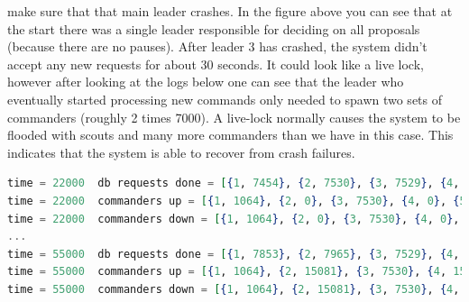 \documentclass[11pt]{article}
\begin{document}
make sure that that main leader crashes. In the figure above you can see that
at the start there was a single leader responsible for deciding on all
proposals (because there are no pauses). After leader 3 has crashed, the system
didn't accept any new requests for about 30 seconds. It could look like a live
lock, however after looking at the logs below one can see that the leader who
eventually started processing new commands only needed to
spawn two sets of commanders (roughly 2 times 7000). A live-lock normally causes the system to be
flooded with scouts and many more commanders than we have in this case. This indicates that the
system is able to recover from crash failures.
\begin{lstlisting}[language=elixir, caption={Commanders spawned before starting to make progress.},captionpos=b]
time = 22000  db requests done = [{1, 7454}, {2, 7530}, {3, 7529}, {4, 7422}, {5, 6967}]
time = 22000  commanders up = [{1, 1064}, {2, 0}, {3, 7530}, {4, 0}, {5, 1063}]
time = 22000  commanders down = [{1, 1064}, {2, 0}, {3, 7530}, {4, 0}, {5, 1063}]
...
time = 55000  db requests done = [{1, 7853}, {2, 7965}, {3, 7529}, {4, 7771}, {5, 6967}]
time = 55000  commanders up = [{1, 1064}, {2, 15081}, {3, 7530}, {4, 15514}, {5, 1063}]
time = 55000  commanders down = [{1, 1064}, {2, 15081}, {3, 7530}, {4, 15513}, {5, 1063}]
\end{lstlisting}
\end{document}
